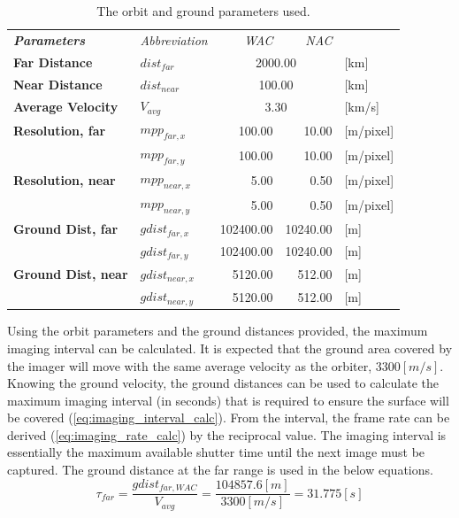 \begin{table}[htb]
  \centering
    \begin{tabular}{l|l|r|r|l}
\textit{\textbf{Parameters}} & \textit{Abbreviation} & \multicolumn{1}{r}{\textit{WAC}} & \multicolumn{1}{r}{\textit{NAC}} &  \bigstrut[b]\\
\cline{1-4}\textbf{Far Distance} & $dist_{far}$ & \multicolumn{2}{c|}{2000.00} & [km] \bigstrut[t]\\
\textbf{Near Distance} & $dist_{near}$ & \multicolumn{2}{c|}{100.00} & [km] \\
\textbf{Average Velocity} & $V_{avg}$ & \multicolumn{2}{c|}{3.30} & [km/s] \bigstrut[b]\\
\cline{1-4}\textbf{Resolution, far} & $mpp_{far,x}$ & 100.00 & 10.00 & [m/pixel] \bigstrut[t]\\
      & $mpp_{far,y}$ & 100.00 & 10.00 & [m/pixel] \bigstrut[b]\\
\cline{2-4}\textbf{Resolution, near} & $mpp_{near,x}$ & 5.00  & 0.50  & [m/pixel] \bigstrut[t]\\
      & $mpp_{near,y}$ & 5.00  & 0.50  & [m/pixel] \bigstrut[b]\\
\cline{1-4}\textbf{Ground Dist, far} & $gdist_{far,x}$ & 102400.00 & 10240.00 & [m] \bigstrut[t]\\
      & $gdist_{far,y}$ & 102400.00 & 10240.00 & [m] \bigstrut[b]\\
\cline{2-4}\textbf{Ground Dist, near} & $gdist_{near,x}$ & 5120.00 & 512.00 & [m] \bigstrut[t]\\
      & $gdist_{near,y}$ & 5120.00 & 512.00 & [m] \\
\end{tabular}%
  \caption{The orbit and ground parameters used.}
  \label{tab:imaging_parameters}%
\end{table}%
Using the orbit parameters and the ground distances provided, the maximum imaging interval can be calculated. It is expected that the ground area covered by the imager will move with the same average velocity as the orbiter, $3300 [m/s]$. Knowing the ground velocity, the ground distances can be used to calculate the maximum imaging interval (in seconds) that is required to ensure the surface will be covered (\ref{eq:imaging_interval_calc}). From the interval, the frame rate can be derived (\ref{eq:imaging_rate_calc}) by the reciprocal value. The imaging interval is essentially the maximum available shutter time until the next image must be captured. The ground distance at the far range is used in the below equations.
\begin{equation}\label{eq:imaging_interval_calc}
\tau_{far} = \frac{gdist_{far,WAC}}{V_{avg}} = \frac{104857.6[m]}{3300[m/s]} = 31.775 [s]
\end{equation}
